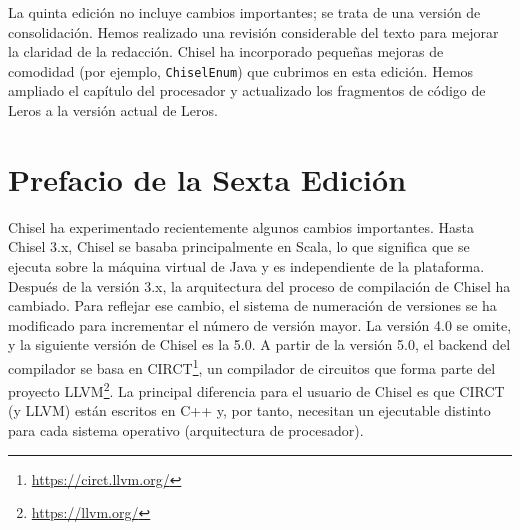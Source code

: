 \documentclass[%
    10pt,
    headinclude, footinclude=false,
    openright, %
    notitlepage,
    cleardoublepage=empty,
    headsepline,
    numbers=noenddot,
    bibliography=totoc, index=totoc,
    ]{scrbook}
\newcommand{\code}[1]{{\lstinline[basicstyle=\small\ttfamily]{#1}}}
\newcommand{\myref}[2]{\href{#1}{#2}}
\renewcommand{\myref}[2]{{#2}{\footnote{\url{#1}}}}
\begin{document}

La quinta edición no incluye cambios importantes; se trata de una versión de consolidación. Hemos realizado una revisión 
considerable del texto para mejorar la claridad de la redacción. Chisel ha incorporado pequeñas mejoras de comodidad 
(por ejemplo, \code{ChiselEnum}) que cubrimos en esta edición. Hemos ampliado el capítulo del procesador y 
actualizado los fragmentos de código de Leros a la versión actual de Leros.

\section*{Prefacio de la Sexta Edición}


Chisel ha experimentado recientemente algunos cambios importantes. Hasta Chisel 3.x, Chisel se basaba principalmente 
en Scala, lo que significa que se ejecuta sobre la máquina virtual de Java y es independiente de la plataforma.
Después de la versión 3.x, la arquitectura del proceso de compilación de Chisel ha cambiado. Para reflejar ese cambio, 
el sistema de numeración de versiones se ha modificado para incrementar el número de versión mayor. La versión 4.0 se 
omite, y la siguiente versión de Chisel es la 5.0.
A partir de la versión 5.0, el backend del compilador se basa en \myref{https://circt.llvm.org/}{CIRCT}, un compilador 
de circuitos que forma parte del proyecto \myref{https://llvm.org/}{LLVM}. La principal diferencia para el usuario de 
Chisel es que CIRCT (y LLVM) están escritos en C++ y, por tanto, necesitan un ejecutable distinto para cada sistema 
operativo (arquitectura de procesador).
\end{document}
